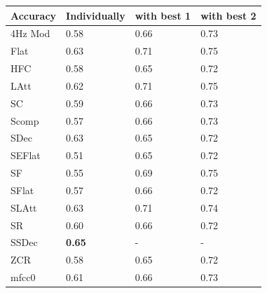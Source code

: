 \begin{table}[H]
\begin{tabular}{|l|l|l|l|}
\hline
\textbf{Accuracy}       & \textbf{Individually}       & \textbf{with best 1}       & \textbf{with best 2}       \\\hline
4Hz Mod                 & 0.58                        & 0.66                       & 0.73                       \\\hline
Flat                    & 0.63                        & 0.71                       & 0.75                       \\\hline
HFC                     & 0.58                        & 0.65                       & 0.72                       \\\hline
LAtt                    & 0.62                        & 0.71                       & 0.75                       \\\hline
SC                      & 0.59                        & 0.66                       & 0.73                       \\\hline
Scomp                   & 0.57                        & 0.66                       & 0.73                       \\\hline
SDec                    & 0.63                        & 0.65                       & 0.72                       \\\hline
SEFlat                  & 0.51                        & 0.65                       & 0.72                       \\\hline
SF                      & 0.55                        & 0.69                       & 0.75                       \\\hline
SFlat                   & 0.57                        & 0.66                       & 0.72                       \\\hline
SLAtt                   & 0.63                        & 0.71                       & 0.74                       \\\hline
SR                      & 0.60                        & 0.66                       & 0.72                       \\\hline
SSDec                   & \textbf{0.65}               & -                          & -                          \\\hline
ZCR                     & 0.58                        & 0.65                       & 0.72                       \\\hline
mfcc0                   & 0.61                        & 0.66                       & 0.73                       \\\hline

\end{tabular}
\end{table}

